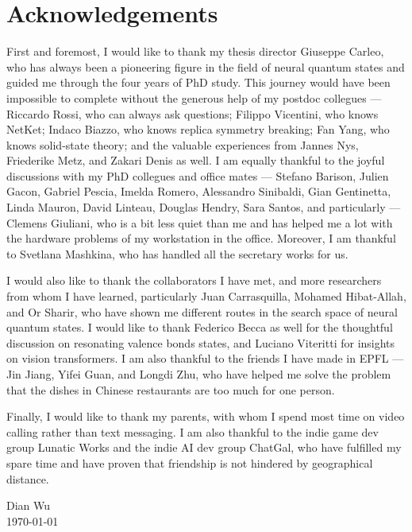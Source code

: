 \chapter*{Acknowledgements}

First and foremost, I would like to thank my thesis director Giuseppe Carleo, who has always been a pioneering figure in the field of neural quantum states and guided me through the four years of PhD study.
This journey would have been impossible to complete without the generous help of my postdoc collegues --- Riccardo Rossi, who can always ask questions; Filippo Vicentini, who knows NetKet; Indaco Biazzo, who knows replica symmetry breaking; Fan Yang, who knows solid-state theory; and the valuable experiences from Jannes Nys, Friederike Metz, and Zakari Denis as well.
I am equally thankful to the joyful discussions with my PhD collegues and office mates --- Stefano Barison, Julien Gacon, Gabriel Pescia, Imelda Romero, Alessandro Sinibaldi, Gian Gentinetta, Linda Mauron, David Linteau, Douglas Hendry, Sara Santos, and particularly --- Clemens Giuliani, who is a bit less quiet than me and has helped me a lot with the hardware problems of my workstation in the office.
Moreover, I am thankful to Svetlana Mashkina, who has handled all the secretary works for us.

I would also like to thank the collaborators I have met, and more researchers from whom I have learned, particularly Juan Carrasquilla, Mohamed Hibat-Allah, and Or Sharir, who have shown me different routes in the search space of neural quantum states. I would like to thank Federico Becca as well for the thoughtful discussion on resonating valence bonds states, and Luciano Viteritti for insights on vision transformers. I am also thankful to the friends I have made in EPFL --- Jin Jiang, Yifei Guan, and Longdi Zhu, who have helped me solve the problem that the dishes in Chinese restaurants are too much for one person.

Finally, I would like to thank my parents, with whom I spend most time on video calling rather than text messaging. I am also thankful to the indie game dev group Lunatic Works and the indie AI dev group ChatGal, who have fulfilled my spare time and have proven that friendship is not hindered by geographical distance.

\begin{flushright}
Dian Wu \\
\today
\end{flushright}
